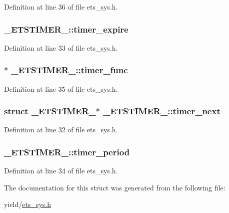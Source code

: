 Definition at line 36 of file ets\-\_\-sys.\-h.

\hypertarget{struct__ETSTIMER___a34542a46b29211ca7f72e4d0bb2dfd60}{
\subsubsection[{timer\-\_\-expire}]{ \-\_\-\-E\-T\-S\-T\-I\-M\-E\-R\-\_\-\-::timer\-\_\-expire}}\label{struct__ETSTIMER___a34542a46b29211ca7f72e4d0bb2dfd60}


Definition at line 33 of file ets\-\_\-sys.\-h.

\hypertarget{struct__ETSTIMER___afaaff07c40e4f2b2c4de07d60981c910}{
\subsubsection[{timer\-\_\-func}]{$\ast$ \-\_\-\-E\-T\-S\-T\-I\-M\-E\-R\-\_\-\-::timer\-\_\-func}}\label{struct__ETSTIMER___afaaff07c40e4f2b2c4de07d60981c910}


Definition at line 35 of file ets\-\_\-sys.\-h.

\hypertarget{struct__ETSTIMER___a6835174d54718f900f1dd6fdd5194419}{
\subsubsection[{timer\-\_\-next}]{\setlength{\rightskip}{0pt plus 5cm}struct {\bf \-\_\-\-E\-T\-S\-T\-I\-M\-E\-R\-\_\-}$\ast$ \-\_\-\-E\-T\-S\-T\-I\-M\-E\-R\-\_\-\-::timer\-\_\-next}}\label{struct__ETSTIMER___a6835174d54718f900f1dd6fdd5194419}


Definition at line 32 of file ets\-\_\-sys.\-h.

\hypertarget{struct__ETSTIMER___ad6bdd67bbd00c9d2a30052e82aac2c9a}{
\subsubsection[{timer\-\_\-period}]{ \-\_\-\-E\-T\-S\-T\-I\-M\-E\-R\-\_\-\-::timer\-\_\-period}}\label{struct__ETSTIMER___ad6bdd67bbd00c9d2a30052e82aac2c9a}


Definition at line 34 of file ets\-\_\-sys.\-h.



The documentation for this struct was generated from the following file\-:\begin{DoxyCompactItemize}
\item 
yield/\hyperlink{ets__sys_8h}{ets\-\_\-sys.\-h}\end{DoxyCompactItemize}
